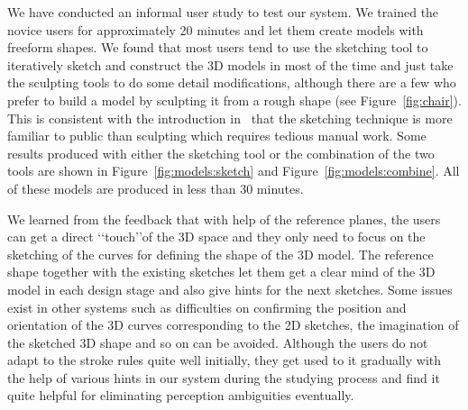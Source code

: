 We have conducted an informal user study to test our system.  We
trained the novice users for approximately 20 minutes and let them
create models with freeform shapes. We found that most users tend to
use the sketching tool to iteratively sketch and construct the 3D
models in most of the time and just take the sculpting tools to do
some detail modifications, although there are a few who prefer to
build a model by sculpting it from a rough shape (see
Figure~\ref{fig:chair}). This is consistent with the introduction
in~\cite{CIW08} that the sketching technique is more familiar to
public than sculpting which requires tedious manual work. Some
results produced with either the sketching tool or the combination
of the two tools are shown in Figure~\ref{fig:models:sketch} and
Figure~\ref{fig:models:combine}. All of these models are produced in
less than 30 minutes.

We learned from the feedback that with help of the reference planes,
the users can get a direct \lq\lq{touch}\rq\rq of the 3D space and
they only need to focus on the sketching of the curves for defining
the shape of the 3D model. The reference shape together with the
existing sketches let them get a clear mind of the 3D model in each
design stage and also give hints for the next sketches. Some issues
exist in other systems such as difficulties on confirming the
position and orientation of the 3D curves corresponding to the 2D
sketches, the imagination of the sketched 3D shape and so on can be
avoided. Although the users do not adapt to the stroke rules quite
well initially, they get used to it gradually with the help of
various hints in our system during the studying process and find it
quite helpful for eliminating perception ambiguities eventually.




